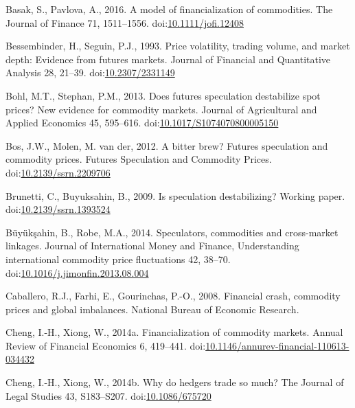 \documentclass[]{elsarticle} %
\begin{document}
\newpage

\hypertarget{refs}{}
\leavevmode\hypertarget{ref-basak_model_2016}{}%
Basak, S., Pavlova, A., 2016. A model of financialization of
commodities. The Journal of Finance 71, 1511--1556.
doi:\href{https://doi.org/10.1111/jofi.12408}{10.1111/jofi.12408}

\leavevmode\hypertarget{ref-bessembinder_price_1993}{}%
Bessembinder, H., Seguin, P.J., 1993. Price volatility, trading volume,
and market depth: Evidence from futures markets. Journal of Financial
and Quantitative Analysis 28, 21--39.
doi:\href{https://doi.org/10.2307/2331149}{10.2307/2331149}

\leavevmode\hypertarget{ref-bohl_does_2013}{}%
Bohl, M.T., Stephan, P.M., 2013. Does futures speculation destabilize
spot prices? New evidence for commodity markets. Journal of Agricultural
and Applied Economics 45, 595--616.
doi:\href{https://doi.org/10.1017/S1074070800005150}{10.1017/S1074070800005150}

\leavevmode\hypertarget{ref-bos_bitter_2012}{}%
Bos, J.W., Molen, M. van der, 2012. A bitter brew? Futures speculation
and commodity prices. Futures Speculation and Commodity Prices.
doi:\href{https://doi.org/10.2139/ssrn.2209706}{10.2139/ssrn.2209706}

\leavevmode\hypertarget{ref-brunetti_is_2009}{}%
Brunetti, C., Buyuksahin, B., 2009. Is speculation destabilizing?
Working paper.
doi:\href{https://doi.org/10.2139/ssrn.1393524}{10.2139/ssrn.1393524}

\leavevmode\hypertarget{ref-buyuksahin_speculators_2014}{}%
Büyükşahin, B., Robe, M.A., 2014. Speculators, commodities and
cross-market linkages. Journal of International Money and Finance,
Understanding international commodity price fluctuations 42, 38--70.
doi:\href{https://doi.org/10.1016/j.jimonfin.2013.08.004}{10.1016/j.jimonfin.2013.08.004}

\leavevmode\hypertarget{ref-caballero_financial_2008}{}%
Caballero, R.J., Farhi, E., Gourinchas, P.-O., 2008. Financial crash,
commodity prices and global imbalances. National Bureau of Economic
Research.

\leavevmode\hypertarget{ref-cheng_financialization_2014}{}%
Cheng, I.-H., Xiong, W., 2014a. Financialization of commodity markets.
Annual Review of Financial Economics 6, 419--441.
doi:\href{https://doi.org/10.1146/annurev-financial-110613-034432}{10.1146/annurev-financial-110613-034432}

\leavevmode\hypertarget{ref-cheng_why_2014}{}%
Cheng, I.-H., Xiong, W., 2014b. Why do hedgers trade so much? The
Journal of Legal Studies 43, S183--S207.
doi:\href{https://doi.org/10.1086/675720}{10.1086/675720}
\end{document}

